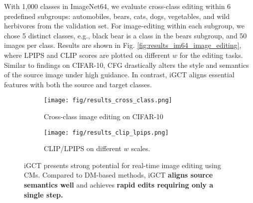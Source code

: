 With 1,000 classes in ImageNet64, we evaluate cross-class editing within 6 predefined subgroups: automobiles, bears, cats, dogs, vegetables, and wild herbivores from the validation set. For image-editing within each subgroup, we chose 5 distinct classes, e.g., black bear is a class in the bears subgroup, and 50 images per class. Results are shown in Fig. \ref{fig:results_im64_image_editing}, where LPIPS and CLIP scores are plotted on different \(w\) for the editing tasks. Similar to findings on CIFAR-10, CFG drastically alters the style and semantics of the source image under high guidance. In contrast, iGCT aligns essential features with both the source and target classes.

\begin{figure}[t!]  
    \centering
    \begin{subfigure}[b]{0.475\textwidth}
    \texttt{[image: fig/results\_cross\_class.png]} 
        \vspace{-1em}
        \caption{Cross-class image editing on CIFAR-10}
    \end{subfigure}
    \hfill
    \begin{subfigure}[b]{0.45\textwidth}
    \texttt{[image: fig/results\_clip\_lpips.png]} 
        \vspace{-1em}
        \caption{CLIP/LPIPS on different \(w\) scales.}
    \end{subfigure}
    \vspace{-1.1em}
    \caption{iGCT presents strong potential for real-time image editing using CMs. Compared to DM-based methods, iGCT \textbf{aligns source semantics well} and achieves \textbf{rapid edits requiring only a single step.}}
    \label{fig:results_editing}
\vspace{-0.5cm}
\end{figure}

